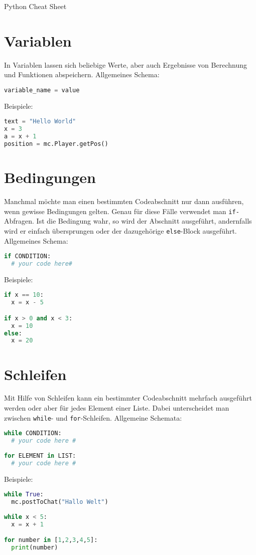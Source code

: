 \documentclass{article}
\begin{document}
	\begin{center}
		{\huge Python Cheat Sheet}
	\end{center}

	\section{Variablen}
		In Variablen lassen sich beliebige Werte, aber auch Ergebnisse von Berechnung und Funktionen abspeichern. Allgemeines Schema:
		\begin{lstlisting}[language=Python]
variable_name = value
		\end{lstlisting}
		Beispiele:
		\begin{lstlisting}[language=Python]
text = "Hello World"
x = 3
a = x + 1
position = mc.Player.getPos()
		\end{lstlisting}
	
	\section{Bedingungen}
	Manchmal möchte man einen bestimmten Codeabschnitt nur dann ausführen, wenn gewisse Bedingungen gelten. Genau für diese Fälle verwendet man \texttt{if-}Abfragen. Ist die Bedingung wahr, so wird der Abschnitt ausgeführt, andernfalls wird er einfach übersprungen oder der dazugehörige \texttt{else}-Block ausgeführt. Allgemeines Schema:
	\begin{lstlisting}[language=Python]
if CONDITION:
  # your code here#
	\end{lstlisting}
	Beispiele:
	\begin{lstlisting}[language=Python]
if x == 10:
  x = x - 5

if x > 0 and x < 3:
  x = 10
else:
  x = 20
	\end{lstlisting}
	
	\section{Schleifen}
	Mit Hilfe von Schleifen kann ein bestimmter Codeabschnitt mehrfach ausgeführt werden oder aber für jedes Element einer Liste. Dabei unterscheidet man zwischen \texttt{while}- und \texttt{for}-Schleifen. Allgemeine Schemata:
	\begin{lstlisting}[language=Python]
while CONDITION:
  # your code here #
	
for ELEMENT in LIST:
  # your code here #
	\end{lstlisting}
	Beispiele:
	\begin{lstlisting}[language=Python]
while True:
  mc.postToChat("Hallo Welt")
	
while x < 5:
  x = x + 1

for number in [1,2,3,4,5]:
  print(number)
	\end{lstlisting}
\end{document}
